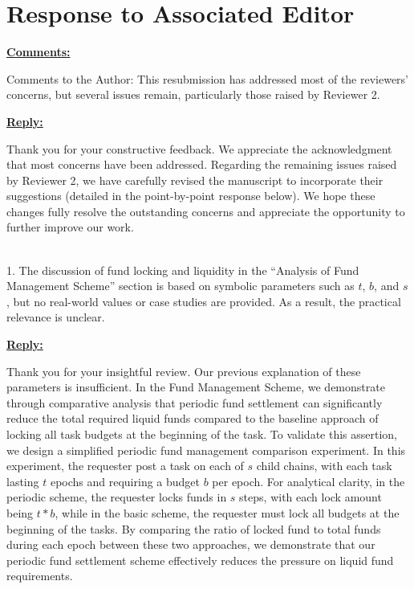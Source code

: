 \section*{Response to Associated Editor}\label{par:r1}

{\large

\noindent \underline{\textbf{Comments:}}

Comments to the Author:
This resubmission has addressed most of the reviewers' concerns, but several issues remain, particularly those raised by Reviewer 2.

{\color{blue}
\noindent \underline{\textbf{Reply:}}

Thank you for your constructive feedback. We appreciate the acknowledgment that most concerns have been addressed. Regarding the remaining issues raised by Reviewer 2, we have carefully revised the manuscript to incorporate their suggestions (detailed in the point-by-point response below). We hope these changes fully resolve the outstanding concerns and appreciate the opportunity to further improve our work.
}\\ %



1. The discussion of fund locking and liquidity in the ``Analysis of Fund Management Scheme'' section is based on symbolic parameters such as $t$, $b$, and $s$, but no real-world values or case studies are provided. As a result, the practical relevance is unclear.

{\color{blue}
\noindent \underline{\textbf{Reply:}}

Thank you for your insightful review. Our previous explanation of these parameters is insufficient. In the Fund Management Scheme, we demonstrate through comparative analysis that periodic fund settlement can significantly reduce the total required liquid funds compared to the baseline approach of locking all task budgets at the beginning of the task. To validate this assertion, we design a simplified periodic fund management comparison experiment. In this experiment, the requester post a task on each of $s$ child chains, with each task lasting $t$ epochs and requiring a budget $b$ per epoch. For analytical clarity, in the periodic scheme, the requester locks funds in $s$ steps, with each lock amount being $t*b$, while in the basic scheme, the requester must lock all budgets at the beginning of the tasks. By comparing the ratio of locked fund to total funds during each epoch between these two approaches, we demonstrate that our periodic fund settlement scheme effectively reduces the pressure on liquid fund requirements.

}}
